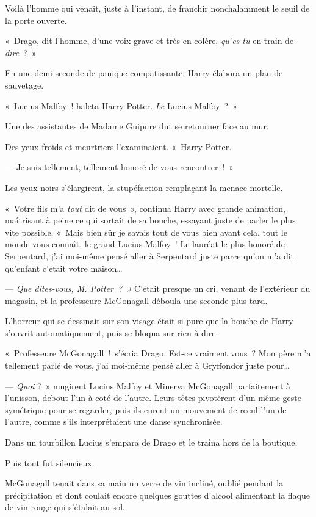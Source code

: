 Voilà l'homme qui venait, juste à l'instant, de franchir nonchalamment le seuil de la porte ouverte.

«~Drago, dit l'homme, d'une voix grave et très en colère, \emph{qu'es-tu} en train de \emph{dire}~?~»

En une demi-seconde de panique compatissante, Harry élabora un plan de sauvetage.

«~Lucius Malfoy~! haleta Harry Potter. \emph{Le} Lucius Malfoy~?~»

Une des assistantes de Madame Guipure dut se retourner face au mur.

Des yeux froids et meurtriers l'examinaient. «~Harry Potter.

--- Je suis tellement, tellement honoré de vous rencontrer~!~»

Les yeux noirs s'élargirent, la stupéfaction remplaçant la menace mortelle.

«~Votre fils m'a \emph{tout} dit de vous~», continua Harry avec grande animation, maîtrisant à peine ce qui sortait de sa bouche, essayant juste de parler le plus vite possible. «~Mais bien sûr je savais tout de vous bien avant cela, tout le monde vous connaît, le grand Lucius Malfoy~! Le lauréat le plus honoré de Serpentard, j'ai moi-même pensé aller à Serpentard juste parce qu'on m'a dit qu'enfant c'était votre maison…

--- \emph{Que dites-vous, M. Potter~?~»} C'était presque un cri, venant de l'extérieur du magasin, et la professeure McGonagall déboula une seconde plus tard.

L'horreur qui se dessinait sur son visage était si pure que la bouche de Harry s'ouvrit automatiquement, puis se bloqua sur rien-à-dire.

«~Professeure McGonagall~!~s'écria Drago. Est-ce vraiment vous~? Mon père m'a tellement parlé de vous, j'ai moi-même pensé aller à Gryffondor juste pour…

--- \emph{Quoi} ?~» mugirent Lucius Malfoy et Minerva McGonagall parfaitement à l'unisson, debout l'un à coté de l'autre. Leurs têtes pivotèrent d'un même geste symétrique pour se regarder, puis ils eurent un mouvement de recul l'un de l'autre, comme s'ils interprétaient une danse synchronisée.

Dans un tourbillon Lucius s'empara de Drago et le traîna hors de la boutique.

Puis tout fut silencieux.

McGonagall tenait dans sa main un verre de vin incliné, oublié pendant la précipitation et dont coulait encore quelques gouttes d'alcool alimentant la flaque de vin rouge qui s'étalait au sol.

